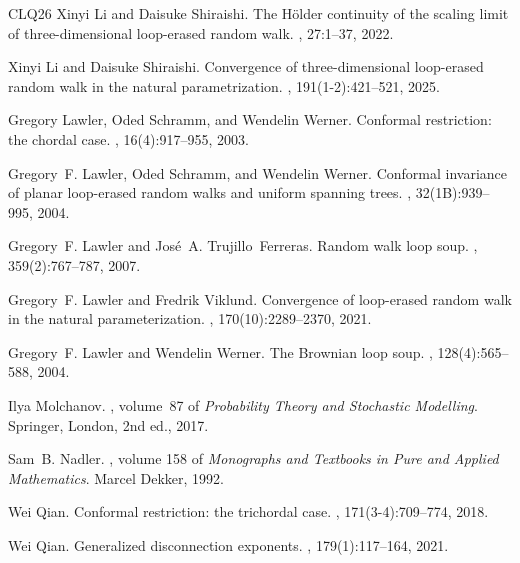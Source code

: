 \documentclass[11pt]{article}
\numberwithin{equation}{section}
\newcommand{\1}{\mathbf{1}}
\begin{document}
{\begin{thebibliography}{CLQ{\etalchar{+}}26}
Xinyi Li and Daisuke Shiraishi.
\newblock The {H{\"o}lder} continuity of the scaling limit of
  three-dimensional loop-erased random walk.
, 27:1--37, 2022.

Xinyi Li and Daisuke Shiraishi.
\newblock Convergence of three-dimensional loop-erased random walk in the
  natural parametrization.
, 191(1-2):421--521, 2025.

Gregory Lawler, Oded Schramm, and Wendelin Werner.
\newblock Conformal restriction: the chordal case.
, 16(4):917--955, 2003.

Gregory~F. Lawler, Oded Schramm, and Wendelin Werner.
\newblock Conformal invariance of planar loop-erased random walks and uniform
  spanning trees.
, 32(1B):939--995, 2004.

Gregory~F. Lawler and Jos{\'e}~A. Trujillo~Ferreras.
\newblock Random walk loop soup.
,
  359(2):767--787, 2007.

Gregory~F. Lawler and Fredrik Viklund.
\newblock Convergence of loop-erased random walk in the natural
  parameterization.
, 170(10):2289--2370, 2021.

Gregory~F. Lawler and Wendelin Werner.
\newblock The {B}rownian loop soup.
, 128(4):565--588, 2004.

Ilya Molchanov.
, volume~87 of {\em Probability Theory and
  Stochastic Modelling}.
\newblock Springer, London, 2nd ed., 2017.

Sam~B. Nadler.
, volume 158 of {\em
  Monographs and Textbooks in Pure and Applied Mathematics}.
\newblock Marcel Dekker, 1992.

Wei Qian.
\newblock Conformal restriction: the trichordal case.
, 171(3-4):709--774, 2018.

Wei Qian.
\newblock Generalized disconnection exponents.
, 179(1):117--164, 2021.


\end{thebibliography}}
\end{document}
